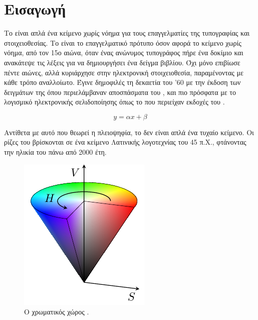 \chapter{Εισαγωγή}

Το  είναι απλά ένα κείμενο χωρίς νόημα για τους επαγγελματίες της τυπογραφίας και στοιχειοθεσίας. Το  είναι το επαγγελματικό πρότυπο όσον αφορά το κείμενο χωρίς νόημα, από τον 15ο αιώνα, όταν ένας ανώνυμος τυπογράφος πήρε ένα δοκίμιο και ανακάτεψε τις λέξεις για να δημιουργήσει ένα δείγμα βιβλίου. Όχι μόνο επιβίωσε πέντε αιώνες, αλλά κυριάρχησε στην ηλεκτρονική στοιχειοθεσία, παραμένοντας με κάθε τρόπο αναλλοίωτο. Έγινε δημοφιλές τη δεκαετία του '60 με την έκδοση των δειγμάτων της  όπου περιελάμβαναν αποσπάσματα του , και πιο πρόσφατα με το λογισμικό ηλεκτρονικής σελιδοποίησης όπως το  που περιείχαν εκδοχές του .

\begin{equation}
	y = \alpha x + \beta
\end{equation}

Αντίθετα με αυτό που θεωρεί η πλειοψηφία, το  δεν είναι απλά ένα τυχαίο κείμενο. Οι ρίζες του βρίσκονται σε ένα κείμενο Λατινικής λογοτεχνίας του 45 π.Χ., φτάνοντας την ηλικία του πάνω από 2000 έτη.

\begin{figure}[htb]
	\centering
	\includegraphics{tikz/hsv_cone/hsv_cone.pdf}
	\caption{Ο χρωματικός χώρος .}
\end{figure}